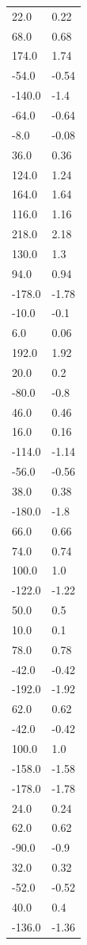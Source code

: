 \begin{longtable}{ll}
22.0 & 0.22 \\
68.0 & 0.68 \\
174.0 & 1.74 \\
-54.0 & -0.54 \\
-140.0 & -1.4 \\
-64.0 & -0.64 \\
-8.0 & -0.08 \\
36.0 & 0.36 \\
124.0 & 1.24 \\
164.0 & 1.64 \\
116.0 & 1.16 \\
218.0 & 2.18 \\
130.0 & 1.3 \\
94.0 & 0.94 \\
-178.0 & -1.78 \\
-10.0 & -0.1 \\
6.0 & 0.06 \\
192.0 & 1.92 \\
20.0 & 0.2 \\
-80.0 & -0.8 \\
46.0 & 0.46 \\
16.0 & 0.16 \\
-114.0 & -1.14 \\
-56.0 & -0.56 \\
38.0 & 0.38 \\
-180.0 & -1.8 \\
66.0 & 0.66 \\
74.0 & 0.74 \\
100.0 & 1.0 \\
-122.0 & -1.22 \\
50.0 & 0.5 \\
10.0 & 0.1 \\
78.0 & 0.78 \\
-42.0 & -0.42 \\
-192.0 & -1.92 \\
62.0 & 0.62 \\
-42.0 & -0.42 \\
100.0 & 1.0 \\
-158.0 & -1.58 \\
-178.0 & -1.78 \\
24.0 & 0.24 \\
62.0 & 0.62 \\
-90.0 & -0.9 \\
32.0 & 0.32 \\
-52.0 & -0.52 \\
40.0 & 0.4 \\
-136.0 & -1.36 \\

\end{longtable}
